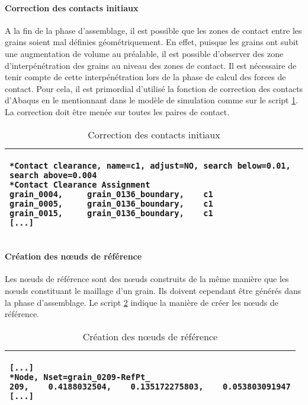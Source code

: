 \paragraph{Correction des contacts initiaux\\}
A la fin de la phase d'assemblage, il est possible que les zones de contact entre les grains soient mal définies géométriquement. En effet, puisque les grains ont subit une augmentation de volume au préalable, il est possible d'observer des zone d'interpénétration des grains au niveau des zones de contact. Il est nécessaire de tenir compte de cette interpénétration lors de la phase de calcul des forces de contact. Pour cela, il est primordial d'utilisé la fonction de correction des contacts d'Abaqus en le mentionnant dans le modèle de simulation comme sur le script \ref{script05:contact_clearance}. La correction doit être menée sur toutes les paires de contact.
\begin{table}[h]\centering
	\begin{tabular}{p{}}
		\hline
		\begin{lstlisting}[language={}, breaklines=true]
*Contact clearance, name=c1, adjust=NO, search below=0.01, search above=0.004
*Contact Clearance Assignment
grain_0004,     grain_0136_boundary,    c1
grain_0005,     grain_0136_boundary,    c1
grain_0015,     grain_0136_boundary,    c1
[...]
		\end{lstlisting}\\
		\hline
	\end{tabular}
	\caption{\label{script05:contact_clearance}Correction des contacts initiaux}
\end{table}

\paragraph{Création des n\oe{}uds de référence\\}
Les n\oe{}uds de référence sont des n\oe{}uds construits de la même manière que les n\oe{}uds constituant le maillage d'un grain. Ils doivent cependant être générés dans la phase d'assemblage. Le script \ref{script05:ref_pts} indique la manière de créer les n\oe{}uds de référence.
\begin{table}[h]\centering
	\begin{tabular}{p{}}
		\hline
		\begin{lstlisting}[language={}, breaklines=true]
[...]
*Node, Nset=grain_0209-RefPt_
209,    0.4188032504,    0.135172275803,    0.053803091947
[...]
		\end{lstlisting}\\
		\hline
	\end{tabular}
	\caption{\label{script05:ref_pts}Création des n\oe{}uds de référence}
\end{table}

